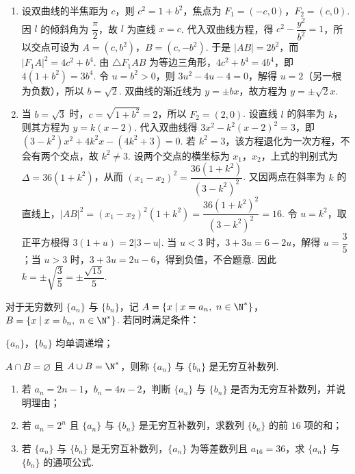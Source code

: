 \begin{solution}
\begin{enumerate}
\item 设双曲线的半焦距为 \(c\)，则 \(c^2=1+b^2\)，焦点为 \(F_1=(-c,0)\)，\(F_2=(c,0)\). 因 \(l\) 的倾斜角为 \(\dfrac\pi2\)，故 \(l\) 为直线 \(x=c\). 代入双曲线方程，得 \(c^2-\dfrac{y^2}{b^2}=1\)，所以交点可设为 \(A=(c,b^2)\)，\(B=(c,-b^2)\). 于是 \(|AB|=2b^2\)，而 \(|F_1A|^2=4c^2+b^4\). 由 \(\triangle F_1AB\) 为等边三角形，\(4c^2+b^4=4b^4\)，即 \(4(1+b^2)=3b^4\). 令 \(u=b^2>0\)，则 \(3u^2-4u-4=0\)，解得 \(u=2\)（另一根为负数），所以 \(b=\sqrt2\). 双曲线的渐近线为 \(y=\pm bx\)，故方程为 \(y=\pm\sqrt2x\).
\item 当 \(b=\sqrt3\) 时，\(c=\sqrt{1+b^2}=2\)，所以 \(F_2=(2,0)\). 设直线 \(l\) 的斜率为 \(k\)，则其方程为 \(y=k(x-2)\). 代入双曲线得
\(3x^2-k^2(x-2)^2=3\)，即 \((3-k^2)x^2+4k^2x-(4k^2+3)=0\). 若 \(k^2=3\)，该方程退化为一次方程，不会有两个交点，故 \(k^2\ne3\). 设两个交点的横坐标为 \(x_1\)，\(x_2\)，上式的判别式为 \(\Delta=36(1+k^2)\)，从而 \((x_1-x_2)^2=\dfrac{36(1+k^2)}{(3-k^2)^2}\). 又因两点在斜率为 \(k\) 的直线上，\(|AB|^2=(x_1-x_2)^2(1+k^2)=\dfrac{36(1+k^2)^2}{(3-k^2)^2}=16\). 令 \(u=k^2\)，取正平方根得 \(3(1+u)=2|3-u|\). 当 \(u<3\) 时，\(3+3u=6-2u\)，解得 \(u=\dfrac35\)；当 \(u>3\) 时，\(3+3u=2u-6\)，得到负值，不合题意. 因此 \(k=\pm\sqrt{\dfrac35}=\pm\dfrac{\sqrt{15}}5\).
\end{enumerate}
\end{solution}

\begin{problem}
对于无穷数列 \(\{a_n\}\) 与 \(\{b_n\}\)，记 \(A=\{x\mid x=a_n,\ n\in\N^*\}\)，\(B=\{x\mid x=b_n,\ n\in\N^*\}\). 若同时满足条件：
\begin{circlelist}
\item \(\{a_n\}\)，\(\{b_n\}\) 均单调递增；
\item \(A\cap B=\varnothing\) 且 \(A\cup B=\N^*\)，则称 \(\{a_n\}\) 与 \(\{b_n\}\) 是无穷互补数列.
\end{circlelist}

\begin{enumerate}
\item 若 \(a_n=2n-1\)，\(b_n=4n-2\)，判断 \(\{a_n\}\) 与 \(\{b_n\}\) 是否为无穷互补数列，并说明理由；
\item 若 \(a_n=2^n\) 且 \(\{a_n\}\) 与 \(\{b_n\}\) 是无穷互补数列，求数列 \(\{b_n\}\) 的前 \(16\) 项的和；
\item 若 \(\{a_n\}\) 与 \(\{b_n\}\) 是无穷互补数列，\(\{a_n\}\) 为等差数列且 \(a_{16}=36\)，求 \(\{a_n\}\) 与 \(\{b_n\}\) 的通项公式.
\end{enumerate}
\end{problem}

